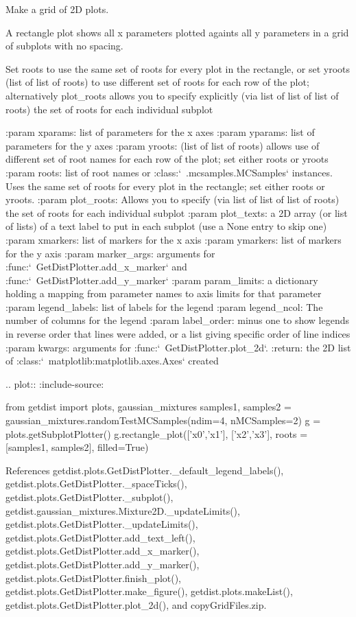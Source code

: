 \begin{DoxyVerb}Make a grid of 2D plots.

A rectangle plot shows all x parameters plotted againts all y parameters in a grid of subplots with no spacing.

Set roots to use the same set of roots for every plot in the rectangle, or set
yroots (list of list of roots) to use different set of roots for each row of the plot; alternatively
plot_roots allows you to specify explicitly (via list of list of list of roots) the set of roots for each individual subplot

:param xparams: list of parameters for the x axes
:param yparams: list of parameters for the y axes
:param yroots: (list of list of roots) allows use of different set of root names for each row of the plot;
       set either roots or yroots
:param roots: list of root names or :class:`~.mcsamples.MCSamples` instances. 
Uses the same set of roots for every plot in the rectangle; set either roots or yroots.
:param plot_roots: Allows you to specify (via list of list of list of roots) the set of roots for each individual subplot
:param plot_texts: a 2D array (or list of lists) of a text label to put in each subplot (use a None entry to skip one)
:param xmarkers: list of markers for the x axis
:param ymarkers: list of markers for the y axis
:param marker_args: arguments for :func:`~GetDistPlotter.add_x_marker` and :func:`~GetDistPlotter.add_y_marker`
:param param_limits: a dictionary holding a mapping from parameter names to axis limits for that parameter
:param legend_labels: list of labels for the legend
:param legend_ncol: The number of columns for the legend
:param label_order: minus one to show legends in reverse order that lines were added, or a list giving specific order of line indices 
:param kwargs: arguments for :func:`~GetDistPlotter.plot_2d`.
:return: the 2D list of :class:`~matplotlib:matplotlib.axes.Axes` created

.. plot::
   :include-source: 

    from getdist import plots, gaussian_mixtures
    samples1, samples2 = gaussian_mixtures.randomTestMCSamples(ndim=4, nMCSamples=2)
    g = plots.getSubplotPlotter()
    g.rectangle_plot(['x0','x1'], ['x2','x3'], roots = [samples1, samples2], filled=True)
\end{DoxyVerb}
 

References getdist.\+plots.\+Get\+Dist\+Plotter.\+\_\+default\+\_\+legend\+\_\+labels(), getdist.\+plots.\+Get\+Dist\+Plotter.\+\_\+space\+Ticks(), getdist.\+plots.\+Get\+Dist\+Plotter.\+\_\+subplot(), getdist.\+gaussian\+\_\+mixtures.\+Mixture2\+D.\+\_\+update\+Limits(), getdist.\+plots.\+Get\+Dist\+Plotter.\+\_\+update\+Limits(), getdist.\+plots.\+Get\+Dist\+Plotter.\+add\+\_\+text\+\_\+left(), getdist.\+plots.\+Get\+Dist\+Plotter.\+add\+\_\+x\+\_\+marker(), getdist.\+plots.\+Get\+Dist\+Plotter.\+add\+\_\+y\+\_\+marker(), getdist.\+plots.\+Get\+Dist\+Plotter.\+finish\+\_\+plot(), getdist.\+plots.\+Get\+Dist\+Plotter.\+make\+\_\+figure(), getdist.\+plots.\+make\+List(), getdist.\+plots.\+Get\+Dist\+Plotter.\+plot\+\_\+2d(), and copy\+Grid\+Files.\+zip.



